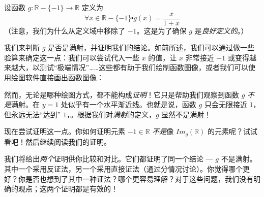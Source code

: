 \begin{example}
    设函数 $g : \mathbb{R} - \{-1\} \to \mathbb{R}$ 定义为 
    \[\forall x \in \mathbb{R} - \{-1\} \centerdot g(x) = \frac{x}{1+x}\]
    （注意，我们为什么从定义域中移除了 $-1$。这是为了确保 $g$ 是\emph{良好定义的}。）

    我们来判断 $g$ 是否是满射，并证明我们的结论。如前所述，我们可以通过做一些验算来确定这一点：我们可以尝试代入一些 $x$ 的值，让 $x$ 非常接近 $-1$ 或变得越来越大，以测试``极端情况''……这些都有助于我们绘制函数图像，或者我们可以使用绘图软件直接画出函数图像：

    \begin{center}
    \end{center}

    然而，无论是哪种绘图方式，都不能构成\emph{证明}！它只是帮助我们观察到函数 $g$ \emph{不是}满射。在 $y = 1$ 处似乎有一个水平渐近线。也就是说，函数 $g$ 只会无限接近 $1$，但永远无法``达到'' $1$，。根据我们对\emph{满射}的定义，$g$ 显然不是满射！

    现在尝试证明这一点。你如何证明元素 $-1 \in \mathbb{R}$ \emph{不是}像 $Im_g(\mathbb{R})$ 的元素呢？试试看吧！然后继续阅读我们的证明。

    我们将给出\emph{两个}证明供你比较和对比。它们都证明了同一个结论 --- $g$ 不是满射。其中一个采用反证法，另一个采用直接证法（通过分情况讨论）。你觉得哪个更好？你是否也想到了其中一种证法？哪个更容易理解？对于这些问题，我们没有明确的观点；这两个证明都是有效的！


\end{example}
